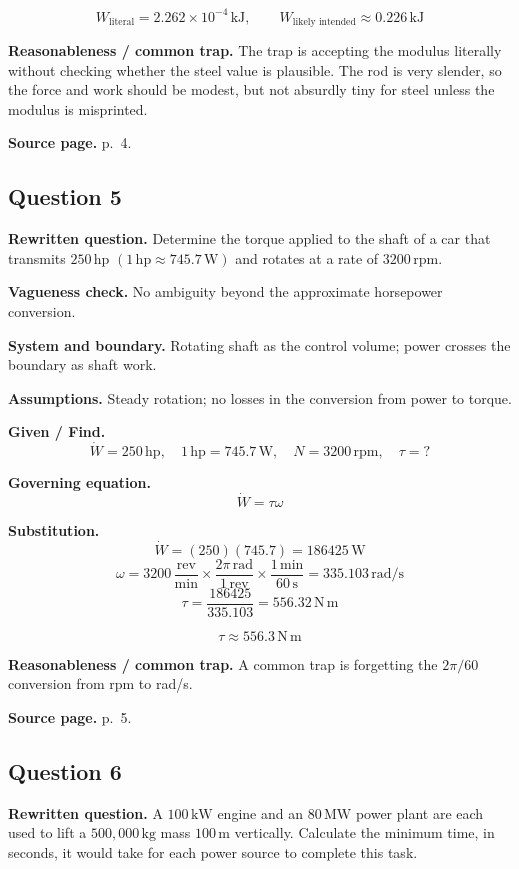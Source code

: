 \[
\boxed{W_{\text{literal}}=2.262\times10^{-4}\,\mathrm{kJ}},\qquad
\boxed{W_{\text{likely intended}}\approx0.226\,\mathrm{kJ}}
\]

\textbf{Reasonableness / common trap.} The trap is accepting the modulus literally without checking whether the steel value is plausible. The rod is very slender, so the force and work should be modest, but not absurdly tiny for steel unless the modulus is misprinted.

\textbf{Source page.} p.~4.

\subsection*{Question 5}
\textbf{Rewritten question.} Determine the torque applied to the shaft of a car that transmits $250\,\mathrm{hp}$ $(1\,\mathrm{hp}\approx745.7\,\mathrm{W})$ and rotates at a rate of $3200\,\mathrm{rpm}$.

\textbf{Vagueness check.} No ambiguity beyond the approximate horsepower conversion.

\textbf{System and boundary.} Rotating shaft as the control volume; power crosses the boundary as shaft work.

\textbf{Assumptions.} Steady rotation; no losses in the conversion from power to torque.

\textbf{Given / Find.}
\[
\dot W=250\,\mathrm{hp},\quad 1\,\mathrm{hp}=745.7\,\mathrm{W},\quad N=3200\,\mathrm{rpm},\quad \tau=?
\]

\textbf{Governing equation.}
\[
\dot W=\tau\omega
\]

\textbf{Substitution.}
\[
\dot W=(250)(745.7)=186425\,\mathrm{W}
\]
\[
\omega=3200\,\frac{\mathrm{rev}}{\mathrm{min}}\times\frac{2\pi\,\mathrm{rad}}{1\,\mathrm{rev}}\times\frac{1\,\mathrm{min}}{60\,\mathrm{s}}=335.103\,\mathrm{rad/s}
\]
\[
\tau=\frac{186425}{335.103}=556.32\,\mathrm{N\,m}
\]

\[\boxed{\tau\approx556.3\,\mathrm{N\,m}}\]

\textbf{Reasonableness / common trap.} A common trap is forgetting the $2\pi/60$ conversion from rpm to rad/s.

\textbf{Source page.} p.~5.

\subsection*{Question 6}
\textbf{Rewritten question.} A $100\,\mathrm{kW}$ engine and an $80\,\mathrm{MW}$ power plant are each used to lift a $500{,}000\,\mathrm{kg}$ mass $100\,\mathrm{m}$ vertically. Calculate the minimum time, in seconds, it would take for each power source to complete this task.

